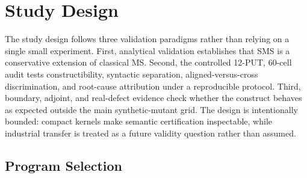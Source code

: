 \documentclass[manuscript,screen,review]{acmart}
\begin{document}

\section{Study Design}\label{experimental-subjects-and-operator-framework}

The study design follows three validation paradigms rather than relying
on a single small experiment. First, analytical validation establishes
that SMS is a conservative extension of classical MS. Second, the
controlled 12-PUT, 60-cell audit tests constructibility, syntactic
separation, aligned-versus-cross discrimination, and root-cause
attribution under a reproducible protocol. Third, boundary, adjoint, and
real-defect evidence check whether the construct behaves as expected
outside the main synthetic-mutant grid. The design is intentionally
bounded: compact kernels make semantic certification inspectable, while
industrial transfer is treated as a future validity question rather than
assumed.

\subsection{Program Selection}\label{put-selection-12-puts-4-classes}
\end{document}
